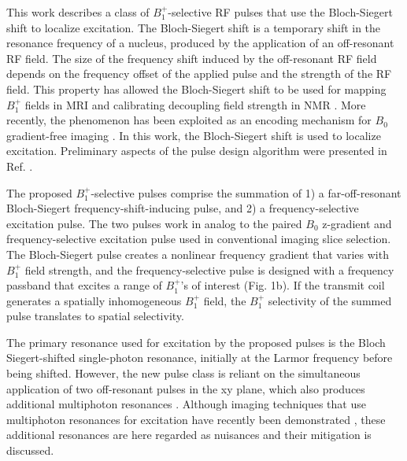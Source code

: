 \documentclass[a4paper,12pt]{article}
\begin{document}
\par This work describes a class of $B_1^+$-selective RF pulses that use the Bloch-Siegert shift \cite{Bloch1940MagneticFields} to localize excitation. 
The Bloch-Siegert shift is a temporary shift in the resonance frequency of a nucleus, produced by the application of an off-resonant RF field. 
The size of the frequency shift induced by the off-resonant RF field depends on the frequency offset of the applied pulse and the strength of the RF field. 
This property has allowed the Bloch-Siegert shift to be used for mapping $B_1^+$ fields in MRI \cite{Sacolick2010B1Shift} and calibrating decoupling field strength in NMR \cite{Hosur1983AShifts,Hung2020UsingSample}. 
More recently, the phenomenon has been exploited as an encoding mechanism for $B_0$ gradient-free imaging \cite{Kartausch2014SpatialEffect, Zhipeng2014FrequencyShift, Wan2017PhaseTransmit}. 
In this work, the Bloch-Siegert shift is used to localize excitation.
Preliminary aspects of the pulse design algorithm were presented in Ref. \cite{Martin2021Bloch-SiegertPulses}.

\par The proposed $B_1^+$-selective pulses comprise the summation of 1) a far-off-resonant Bloch-Siegert frequency-shift-inducing pulse, 
and 2) a frequency-selective excitation pulse. 
The two pulses work in analog to the paired $B_0$ z-gradient and frequency-selective excitation pulse used in conventional imaging slice selection. 
The Bloch-Siegert pulse creates a nonlinear frequency gradient that varies with $B_1^+$ field strength, 
and the frequency-selective pulse is designed with a frequency passband that excites a range of $B_1^+$'s of interest (Fig. 1b). 
If the transmit coil generates a spatially inhomogeneous $B_1^+$ field,
the $B_1^+$ selectivity of the summed pulse translates to spatial selectivity. 

\par The primary resonance used for excitation by the proposed pulses is the Bloch Siegert-shifted single-photon resonance, initially at the Larmor frequency before being shifted. 
However, the new pulse class is reliant on the simultaneous application of two off-resonant pulses in the xy plane, 
which also produces additional multiphoton resonances \cite{Zur1983MultiphotonI=1/2, Krauss1986Four-fieldI=1/2}.
Although imaging techniques that use multiphoton resonances for excitation have recently been demonstrated \cite{Han2020MultiphotonImplementation}, 
these additional resonances are here regarded as nuisances and their mitigation is discussed.
\end{document}
